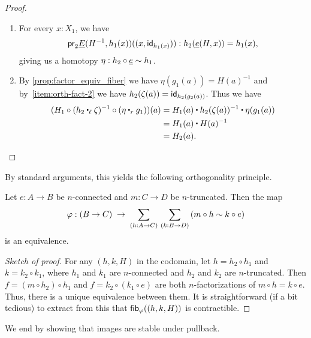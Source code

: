 \begin{proof}
\begin{enumerate}
\item For every $x:X_1$, we have
\begin{equation*}
\proj2\underline{E}(H^{-1},h_1(x))(\pairr{x,\idfunc[h_1(x)]}):h_2(\underline{e}(H,x))= h_1(x),
\end{equation*}
giving us a homotopy $\eta:h_2\circ \underline{e}\htpy h_1$.
\item By \autoref{prop:factor_equiv_fiber} we have $\eta(g_1(a))=H(a)^{-1}$ and by~\ref{item:orth-fact-2} we have
$\ap{h_2}{\zeta(a)}=\idfunc[h_2(g_2(a))]$. Thus we have
\begin{align*}
(H_1 \circ(h_2\leftwhisker\zeta)^{-1}\circ(\eta\rightwhisker g_1))(a) & = H_1(a)\ct h_2(\zeta(a))^{-1}\ct \eta(g_1(a))\\
& = H_1(a)\ct H(a)^{-1}\\
& = H_2(a).\qedhere
\end{align*}
\end{enumerate}
\end{proof}

%

By standard arguments, this yields the following orthogonality principle.

\begin{thm}
  Let $e:A\to B$ be $n$-connected and $m:C\to D$ be $n$-truncated.
  Then the map
  \[ \varphi: (B\to C) \;\to\; \sm{h:A\to C}{k:B\to D} (m\circ h \htpy k \circ e) \]
  is an equivalence.
\end{thm}
\begin{proof}[Sketch of proof]
  For any $(h,k,H)$ in the codomain, let $h = h_2 \circ h_1$ and $k = k_2 \circ k_1$, where $h_1$ and $k_1$ are $n$-connected and $h_2$ and $k_2$ are $n$-truncated.
  Then $f = (m\circ h_2) \circ h_1$ and $f = k_2 \circ (k_1\circ e)$ are both $n$-factorizations of $m \circ h = k\circ e$.
  Thus, there is a unique equivalence between them.
  It is straightforward (if a bit tedious) to extract from this that $\hfib\varphi{(h,k,H)}$ is contractible.
\end{proof}

We end by showing that images are stable under pullback.

